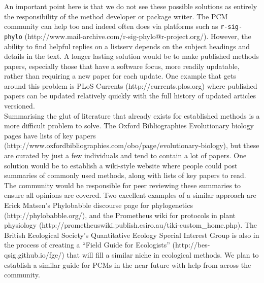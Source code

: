 \documentclass[a4paper,12pt]{article}
\begin{document}
    An important point here is that we do not see these possible solutions as entirely the responsibility of the method developer or package writer. 
    The PCM community can help too and indeed often does via platforms such as \texttt{r-sig-phylo} (http://www.mail-archive.com/r-sig-phylo@r-project.org/).
    However, the ability to find helpful replies on a listserv depends on the subject headings and details in the text.
    A longer lasting solution would be to make published methods papers, especially those that have a software focus, more readily updatable, rather than requiring a new paper for each update.
    One example that gets around this problem is PLoS Currents (http://currents.plos.org) where published papers can be updated relatively quickly with the full history of updated articles versioned.\\
    
    Summarising the glut of literature that already exists for established methods is a more difficult problem to solve.
    The Oxford Bibliographies Evolutionary biology pages have lists of key papers (http://www.oxfordbibliographies.com/obo/page/evolutionary-biology), but these are curated by just a few individuals and tend to contain a lot of papers. 
    One solution would be to establish a wiki-style website where people could post summaries of commonly used methods, along with lists of key papers to read. 
    The community would be responsible for peer reviewing these summaries to ensure all opinions are covered. 
    Two excellent examples of a similar approach are Erick Matsen's Phylobabble discourse page for phylogenetics (http://phylobabble.org/), and the Prometheus wiki for protocols in plant physiology (http://prometheuswiki.publish.csiro.au/tiki-custom\_home.php). 
    The British Ecological Society's Quantitative Ecology Special Interest Group is also in the process of creating a ``Field Guide for Ecologists'' (http://bes-qsig.github.io/fge/) that will fill a similar niche in ecological methods.
    We plan to establish a similar guide for PCMs in the near future with help from across the community.\\
\end{document}
